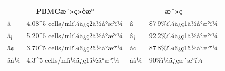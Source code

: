 \documentclass[UTF8,10pt,a4paper,fontset=fandol]{ctexart}
\newcommand{\fieldvalue}[1]{#1}
\newcommand{\handwritten}[1]{#1}
\begin{document}
\begin{center}
\begin{center}
\noindent
\begin{tabularx}{\textwidth}{|p{}|X|p{}|X|}
\hline
\multicolumn{2}{|c|}{PBMCæ´»ç»èæ°} & \multicolumn{2}{c|}{æ´»ç}\\
\hline
â  &
\fieldvalue{\handwritten{4.08\times10^{5}}} cells/mlï¼ä¿ç2ä½å°æ°ï¼&
â  &
\fieldvalue{\handwritten{87.9}}\%ï¼ä¿ç1ä½å°æ°ï¼\\
\hline
â¡ &
\fieldvalue{\handwritten{5.20\times10^{5}}} cells/mlï¼ä¿ç2ä½å°æ°ï¼&
â¡ &
\fieldvalue{\handwritten{92.2}}\%ï¼ä¿ç1ä½å°æ°ï¼\\
\hline
â¢ &
\fieldvalue{\handwritten{3.70\times10^{5}}} cells/mlï¼ä¿ç2ä½å°æ°ï¼&
â¢ &
\fieldvalue{\handwritten{87.8}}\%ï¼ä¿ç1ä½å°æ°ï¼\\
\hline
åå¼ &
\fieldvalue{\handwritten{4.3\times10^{5}}} cells/mlï¼ä¿ç1ä½å°æ°ï¼&
åå¼ &
\fieldvalue{\handwritten{90}}\%ï¼ä¿çæ´æ°ï¼\\
\hline
\end{tabularx}


\end{center}
\end{center}
\end{document}

